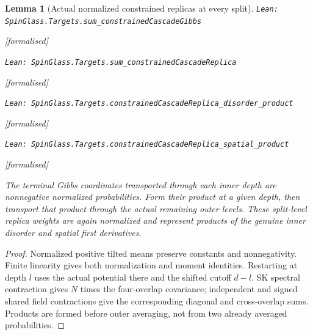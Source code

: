 \documentclass[11pt]{article}
\providecommand{\lean}[1]{\leavevmode\par\nopagebreak
  {\noindent\normalfont\footnotesize\raggedright\texttt{Lean: #1}\par}\nopagebreak}
\providecommand{\leanok}{\par\nopagebreak
  {\noindent\normalfont\footnotesize\textcolor{green!50!black}{[formalised]}\par}\nopagebreak}
\newtheorem{lemma}[theorem]{Lemma}
\begin{document}
\begin{lemma}[Actual normalized constrained replicas at every split]
\lean{SpinGlass.Targets.sum\_constrainedCascadeGibbs}\leanok
\lean{SpinGlass.Targets.sum\_constrainedCascadeReplica}\leanok
\lean{SpinGlass.Targets.constrainedCascadeReplica\_disorder\_product}\leanok
\lean{SpinGlass.Targets.constrainedCascadeReplica\_spatial\_product}\leanok
The terminal Gibbs coordinates transported through each inner depth are
nonnegative normalized probabilities. Form their product at a given depth,
then transport that product through the actual remaining outer levels.
These split-level replica weights are again normalized and represent
products of the genuine inner disorder and spatial first derivatives.
\end{lemma}
\begin{proof}
Normalized positive tilted means preserve constants and nonnegativity.
Finite linearity gives both normalization and moment identities. Restarting
at depth $l$ uses the actual potential there and the shifted cutoff $d-l$.
SK spectral contraction gives $N$ times the four-overlap covariance;
independent and signed shared field contractions give the corresponding
diagonal and cross-overlap sums. Products are formed before outer averaging,
not from two already averaged probabilities.
\end{proof}
\end{document}
